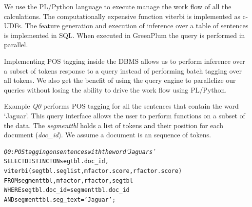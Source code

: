 We use the PL/Python language to execute manage the work flow of all the 
calculations.
The computationally expensive function viterbi is implemented as c-UDFs.
The feature generation and execution of inference 
over a table of sentences is implemented in {SQL}. When executed in GreenPlum 
the query is performed in parallel.


Implementing POS tagging inside the DBMS allows us to perform inference over a 
subset of tokens response to a query instead of performing batch tagging over 
all tokens.
We also get the benefit of using the query engine to parallelize our queries
without losing the ability to drive the work flow using PL/Python.


Example \textit{Q0} performs POS tagging for  all the sentences that contain
the word `Jaguar'. This query interface allows the user to perform
functions on a subset of the data.
The \textit{segmenttbl} holds a list of tokens and their position for each
document (\textit{doc\_id}). We assume a document is an sequence of tokens.


\begin{small}
\begin{alltt}
\textit{Q0: POS tagging on sentences with the word `Jaguars'}
SELECT DISTINCT ON segtbl.doc_id,
    viterbi(segtbl.seglist,mfactor.score,rfactor.score)
FROM segmenttbl, mfactor, rfactor, segtbl
WHERE segtbl.doc_id = segmenttbl.doc_id 
    AND segmenttbl.seg_text='Jaguar';
\end{alltt}
\end{small}














